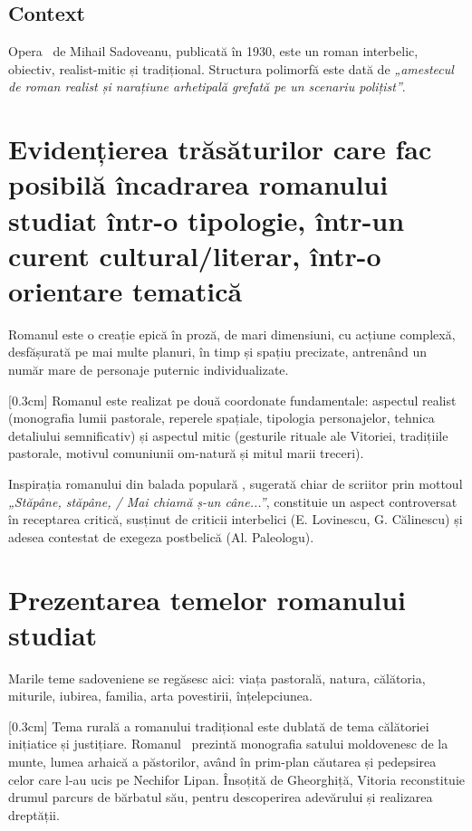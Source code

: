 \renewcommand{\operatitle}{\textbfit{„Baltagul”}} %
\renewcommand{\operaauthor}{Mihail Sadoveanu} %


\subsection{Context}

Opera \operatitle\ de \operaauthor, publicată în 1930, este un roman interbelic, obiectiv, realist-mitic și tradițional. Structura polimorfă este dată de \textit{„amestecul de roman realist și narațiune arhetipală grefată pe un scenariu polițist”}.


\section{Evidențierea trăsăturilor care fac posibilă încadrarea romanului studiat într-o tipologie, într-un curent cultural/literar, într-o orientare tematică}

Romanul este o creație epică în proză, de mari dimensiuni, cu acțiune complexă, desfășurată pe mai multe planuri, în timp și spațiu precizate, antrenând un număr mare de personaje puternic individualizate.

[0.3cm]
Romanul este realizat pe două coordonate fundamentale: aspectul realist (monografia lumii pastorale, reperele spațiale, tipologia personajelor, tehnica detaliului semnificativ) și aspectul mitic (gesturile rituale ale Vitoriei, tradițiile pastorale, motivul comuniunii om-natură și mitul marii treceri).

Inspirația romanului din balada populară , sugerată chiar de scriitor prin mottoul \textit{„Stăpâne, stăpâne, / Mai chiamă ș-un câne...”}, constituie un aspect controversat în receptarea critică, susținut de criticii interbelici (E. Lovinescu, G. Călinescu) și adesea contestat de exegeza postbelică (Al. Paleologu).


\section{Prezentarea temelor romanului studiat}

Marile teme sadoveniene se regăsesc aici: viața pastorală, natura, călătoria, miturile, iubirea, familia, arta povestirii, înțelepciunea.

[0.3cm]
Tema rurală a romanului tradițional este dublată de tema călătoriei inițiatice și justițiare. Romanul \operatitle\ prezintă monografia satului moldovenesc de la munte, lumea arhaică a păstorilor, având în prim-plan căutarea și pedepsirea celor care l-au ucis pe Nechifor Lipan. Însoțită de Gheorghiță, Vitoria reconstituie drumul parcurs de bărbatul său, pentru descoperirea adevărului și realizarea dreptății.


